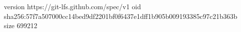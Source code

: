 version https://git-lfs.github.com/spec/v1
oid sha256:57f7a507000cc14bed9df2201bf0f6437e1dff1b905b009193385c97c21b363b
size 699212
